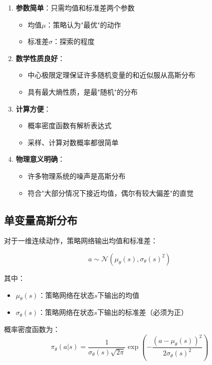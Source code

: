 \begin{enumerate}
    \item \textbf{参数简单}：只需均值和标准差两个参数
    \begin{itemize}
        \item 均值$\mu$：策略认为"最优"的动作
        \item 标准差$\sigma$：探索的程度
    \end{itemize}
    
    \item \textbf{数学性质良好}：
    \begin{itemize}
        \item 中心极限定理保证许多随机变量的和近似服从高斯分布
        \item 具有最大熵性质，是最"随机"的分布
    \end{itemize}
    
    \item \textbf{计算方便}：
    \begin{itemize}
        \item 概率密度函数有解析表达式
        \item 采样、计算对数概率都很简单
    \end{itemize}
    
    \item \textbf{物理意义明确}：
    \begin{itemize}
        \item 许多物理系统的噪声是高斯分布
        \item 符合"大部分情况下接近均值，偶尔有较大偏差"的直觉
    \end{itemize}
\end{enumerate}

\subsection{单变量高斯分布}

对于一维连续动作，策略网络输出均值和标准差：

\[
a \sim \mathcal{N}(\mu_\theta(s), \sigma_\theta(s)^2)
\]

其中：
\begin{itemize}
    \item $\mu_\theta(s)$：策略网络在状态$s$下输出的均值
    \item $\sigma_\theta(s)$：策略网络在状态$s$下输出的标准差（必须为正）
\end{itemize}

概率密度函数为：
\[
\pi_\theta(a|s) = \frac{1}{\sigma_\theta(s)\sqrt{2\pi}} \exp\left(-\frac{(a - \mu_\theta(s))^2}{2\sigma_\theta(s)^2}\right)
\]

